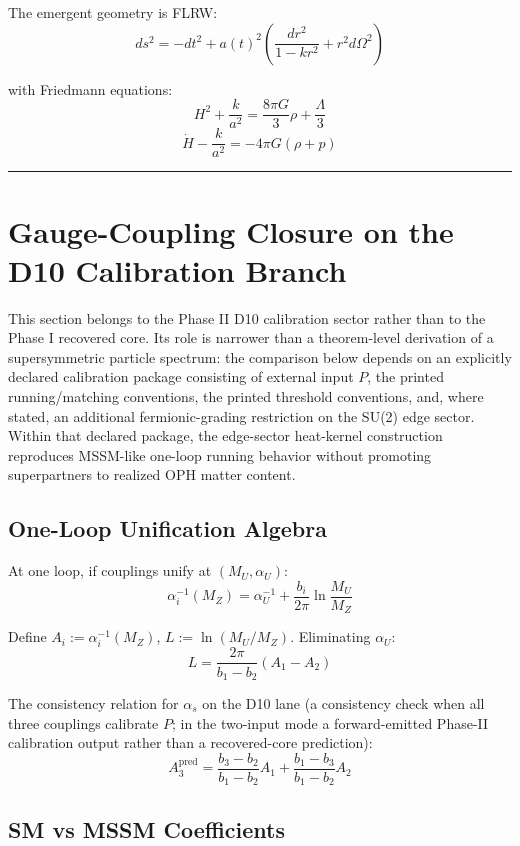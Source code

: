The emergent geometry is FLRW: \[ds^2 = -dt^2 + a(t)^2 \left(\frac{dr^2}{1-kr^2} + r^2 d\Omega^2\right)\]

with Friedmann equations: \[H^2 + \frac{k}{a^2} = \frac{8\pi G}{3}\rho + \frac{\Lambda}{3}\] \[\dot{H} - \frac{k}{a^2} = -4\pi G(\rho + p)\]

\begin{center}\rule{0.5\linewidth}{0.5pt}\end{center}

\section{Gauge-Coupling Closure on the D10 Calibration Branch}\label{5-supersymmetry-and-gauge-coupling-unification}

This section belongs to the Phase II D10 calibration sector rather than to the Phase I recovered core. Its role is narrower than a theorem-level derivation of a supersymmetric particle spectrum: the comparison below depends on an explicitly declared calibration package consisting of external input \(P\), the printed running/matching conventions, the printed threshold conventions, and, where stated, an additional fermionic-grading restriction on the SU(2) edge sector. Within that declared package, the edge-sector heat-kernel construction reproduces MSSM-like one-loop running behavior without promoting superpartners to realized OPH matter content.

\subsection{One-Loop Unification Algebra}\label{51-one-loop-unification-algebra}

At one loop, if couplings unify at \((M_U, \alpha_U)\): \[\alpha_i^{-1}(M_Z) = \alpha_U^{-1} + \frac{b_i}{2\pi}\ln\frac{M_U}{M_Z}\]

Define \(A_i := \alpha_i^{-1}(M_Z)\), \(L := \ln(M_U/M_Z)\). Eliminating \(\alpha_U\): \[L = \frac{2\pi}{b_1 - b_2}(A_1 - A_2)\]

The consistency relation for \(\alpha_s\) on the D10 lane (a consistency check when all three couplings calibrate $P$; in the two-input mode a forward-emitted Phase-II calibration output rather than a recovered-core prediction): \[A_3^{\text{pred}} = \frac{b_3 - b_2}{b_1 - b_2}A_1 + \frac{b_1 - b_3}{b_1 - b_2}A_2\]

\subsection{SM vs MSSM Coefficients}\label{52-sm-vs-mssm-coefficients}

